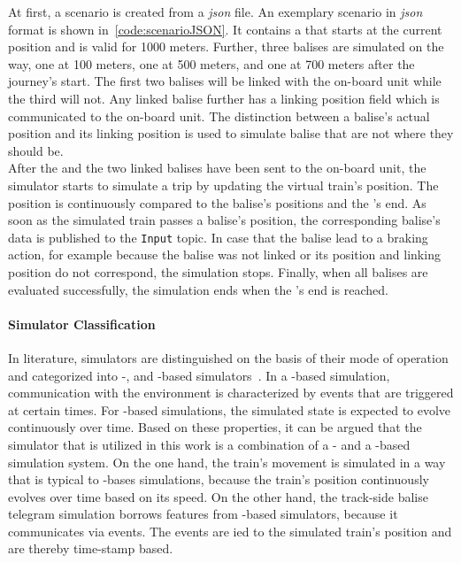 At first, a scenario is created from a \textit{json} file.
An exemplary scenario in \textit{json} format is shown in~\autoref{code:scenarioJSON}.
It contains a  that starts at the current position and is valid for 1000 meters.
Further, three balises are simulated on the way, one at 100 meters, one at 500 meters, and one at 700 meters after the journey's start.
The first two balises will be linked with the on-board unit while the third will not.
Any linked balise further has a linking position field which is communicated to the on-board unit.
The distinction between a balise's actual position and its linking position is used to simulate balise that are not where they should be.
\\

After the  and the two linked balises have been sent to the on-board unit, the simulator starts to simulate a trip by updating the virtual train's position.
The position is continuously compared to the balise's positions and the 's end.
As soon as the simulated train passes a balise's position, the corresponding balise's data is published to the \texttt{Input} topic.
In case that the balise lead to a braking action, for example because the balise was not linked or its position and linking position do not correspond, the simulation stops.
Finally, when all balises are evaluated successfully, the simulation ends when the 's end is reached.
\\

\paragraph{Simulator Classification}
In literature, simulators are distinguished on the basis of their mode of operation and categorized into -, and -based simulators~\cite{CoSimulationStateOfTheArt}.
In a -based simulation, communication with the environment is characterized by events that are triggered at certain times.
For -based simulations, the simulated state is expected to evolve continuously over time.
Based on these properties, it can be argued that the simulator that is utilized in this work is a combination of a - and a -based simulation system.
On the one hand, the train's movement is simulated in a way that is typical to -bases simulations, because the train's position continuously evolves over time based on its speed.
On the other hand, the track-side balise telegram simulation borrows features from -based simulators, because it communicates via events.
The events are ied to the simulated train's position and are thereby time-stamp based.

